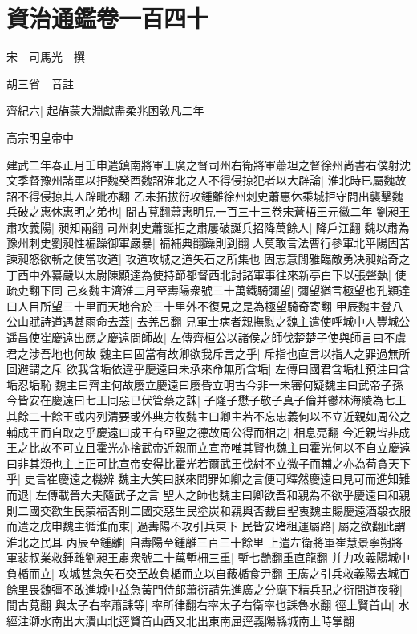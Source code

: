 \chapter{資治通鑑卷一百四十}
宋　司馬光　撰

胡三省　音註

齊紀六|{
	起旃蒙大淵獻盡柔兆困敦凡二年}


高宗明皇帝中

建武二年春正月壬申遣鎮南將軍王廣之督司州右衛將軍蕭坦之督徐州尚書右僕射沈文季督豫州諸軍以拒魏癸酉魏詔淮北之人不得侵掠犯者以大辟論|{
	淮北時已屬魏故詔不得侵掠其人辟毗亦翻}
乙未拓拔衍攻鍾離徐州刺史蕭惠休乘城拒守間出襲擊魏兵破之惠休惠明之弟也|{
	間古莧翻蕭惠明見一百三十三卷宋蒼梧王元徽二年}
劉昶王肅攻義陽|{
	昶知兩翻}
司州刺史蕭誕拒之肅屢破誕兵招降萬餘人|{
	降戶江翻}
魏以肅為豫州刺史劉昶性褊躁御軍嚴暴|{
	褊補典翻躁則到翻}
人莫敢言法曹行參軍北平陽固苦諫昶怒欲斬之使當攻道|{
	攻道攻城之道矢石之所集也}
固志意閒雅臨敵勇决昶始奇之丁酉中外纂嚴以太尉陳顯達為使持節都督西北討諸軍事往來新亭白下以張聲埶|{
	使疏吏翻下同}
己亥魏主濟淮二月至夀陽衆號三十萬鐵騎彌望|{
	彌望猶言極望也孔穎達曰人目所望三十里而天地合於三十里外不復見之是為極望騎奇寄翻}
甲辰魏主登八公山賦詩道遇甚雨命去蓋|{
	去羌呂翻}
見軍士病者親撫慰之魏主遣使呼城中人豐城公遥昌使崔慶遠出應之慶遠問師故|{
	左傳齊桓公以諸侯之師伐楚楚子使與師言曰不虞君之涉吾地也何故}
魏主曰固當有故卿欲我斥言之乎|{
	斥指也直言以指人之罪過無所回避謂之斥}
欲我含垢依違乎慶遠曰未承來命無所含垢|{
	左傳曰國君含垢杜預注曰含垢忍垢恥}
魏主曰齊主何故廢立慶遠曰廢昏立明古今非一未審何疑魏主曰武帝子孫今皆安在慶遠曰七王同惡已伏管蔡之誅|{
	子隆子懋子敬子真子倫并鬱林海陵為七王}
其餘二十餘王或内列清要或外典方牧魏主曰卿主若不忘忠義何以不立近親如周公之輔成王而自取之乎慶遠曰成王有亞聖之德故周公得而相之|{
	相息亮翻}
今近親皆非成王之比故不可立且霍光亦捨武帝近親而立宣帝唯其賢也魏主曰霍光何以不自立慶遠曰非其類也主上正可比宣帝安得比霍光若爾武王伐紂不立微子而輔之亦為苟貪天下乎|{
	史言崔慶遠之機辨}
魏主大笑曰朕來問罪如卿之言便可釋然慶遠曰見可而進知難而退|{
	左傳載晉大夫隨武子之言}
聖人之師也魏主曰卿欲吾和親為不欲乎慶遠曰和親則二國交歡生民蒙福否則二國交惡生民塗炭和親與否裁自聖衷魏主賜慶遠酒殽衣服而遣之戊申魏主循淮而東|{
	過夀陽不攻引兵東下}
民皆安堵租運屬路|{
	屬之欲翻此謂淮北之民耳}
丙辰至鍾離|{
	自夀陽至鍾離三百三十餘里}
上遣左衛將軍崔慧景寧朔將軍裴叔業救鍾離劉昶王肅衆號二十萬塹柵三重|{
	塹七艷翻重直龍翻}
并力攻義陽城中負楯而立|{
	攻城甚急矢石交至故負楯而立以自蔽楯食尹翻}
王廣之引兵救義陽去城百餘里畏魏彊不敢進城中益急黃門侍郎蕭衍請先進廣之分麾下精兵配之衍間道夜發|{
	間古莧翻}
與太子右率蕭誄等|{
	率所律翻右率太子右衛率也誄魯水翻}
徑上賢首山|{
	水經注溮水南出大潰山北逕賢首山西又北出東南屈逕義陽縣城南上時掌翻}

